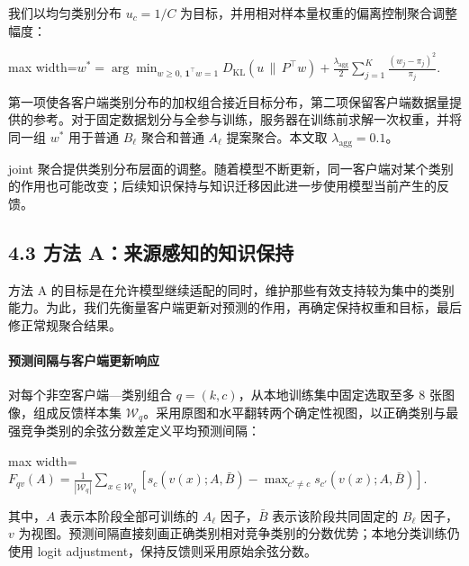\documentclass[UTF8,a4paper,10pt,fontset=fandol]{ctexart}
\begin{document}
我们以均匀类别分布 $u_c=1/C$ 为目标，并用相对样本量权重的偏离控制聚合调整幅度：


\begin{center}\begin{adjustbox}{max width=\linewidth}$\displaystyle w^*=\arg\min_{w\geq0,\,\mathbf1^\top w=1}
D_{\mathrm{KL}}\!\left(u\,\|\,P^\top w\right)
+\frac{\lambda_{\mathrm{agg}}}{2}
\sum_{j=1}^{K}\frac{(w_j-\pi_j)^2}{\pi_j}.$\end{adjustbox}\end{center}

第一项使各客户端类别分布的加权组合接近目标分布，第二项保留客户端数据量提供的参考。对于固定数据划分与全参与训练，服务器在训练前求解一次权重，并将同一组 $w^*$ 用于普通 $B_\ell$ 聚合和普通 $A_\ell$ 提案聚合。本文取 $\lambda_{\mathrm{agg}}=0.1$。


joint 聚合提供类别分布层面的调整。随着模型不断更新，同一客户端对某个类别的作用也可能改变；后续知识保持与知识迁移因此进一步使用模型当前产生的反馈。


\subsection*{4.3 方法 A：来源感知的知识保持}

方法 A 的目标是在允许模型继续适配的同时，维护那些有效支持较为集中的类别能力。为此，我们先衡量客户端更新对预测的作用，再确定保持权重和目标，最后修正常规聚合结果。


\paragraph{预测间隔与客户端更新响应}

对每个非空客户端—类别组合 $q=(k,c)$，从本地训练集中固定选取至多 8 张图像，组成反馈样本集 $\mathcal W_q$。采用原图和水平翻转两个确定性视图，以正确类别与最强竞争类别的余弦分数差定义平均预测间隔：


\begin{center}\begin{adjustbox}{max width=\linewidth}$\displaystyle F_{qv}(A)=\frac{1}{|\mathcal W_q|}
\sum_{x\in\mathcal W_q}
\left[s_c(v(x);A,\bar B)
-\max_{c'\ne c}s_{c'}(v(x);A,\bar B)\right].$\end{adjustbox}\end{center}

其中，$A$ 表示本阶段全部可训练的 $A_\ell$ 因子，$\bar B$ 表示该阶段共同固定的 $B_\ell$ 因子，$v$ 为视图。预测间隔直接刻画正确类别相对竞争类别的分数优势；本地分类训练仍使用 logit adjustment，保持反馈则采用原始余弦分数。
\end{document}
